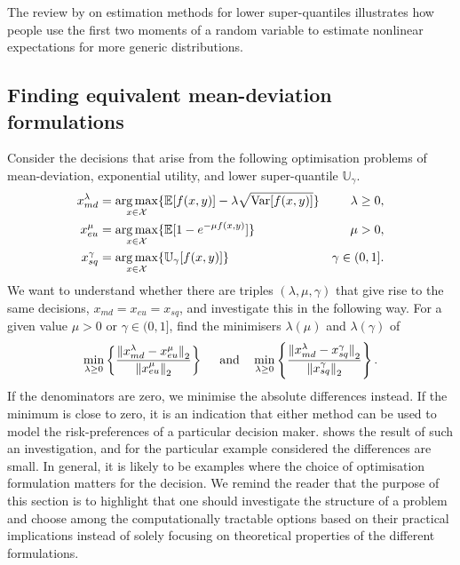 \documentclass[main.tex]{subfiles}
\begin{document}
The review by \citet{nadarajah2014estimation} on estimation methods for
lower super-quantiles illustrates how people use
the first two moments of a random variable to estimate nonlinear
expectations for more generic distributions.


\subsection{Finding equivalent mean-deviation formulations}
Consider the decisions that arise from the following
optimisation problems of mean-deviation, exponential utility, and
lower super-quantile $\mathbb{U}_\gamma$.
\begin{align}\label{eq:optim_formulations_md}
  x_{md}^\lambda
  &=\operatorname*{arg\,max}_{x\in\mathcal{X}}\{\mathbb{E}[f(x,y)]-\lambda\sqrt{\mbox{Var}[f(x,y)]}\}
  &\lambda\geq 0,\\\label{eq:optim_formulations_eu}
  x_{eu}^\mu
  &=\operatorname*{arg\,max}_{x\in\mathcal{X}}\{
    \mathbb{E}[1-e^{-\mu f(x,y)}]\}
  &\mu>0,\\\label{eq:optim_formulations_sq}
  x_{sq}^\gamma
  &=\operatorname*{arg\,max}_{x\in\mathcal{X}}
    \{\mathbb{U}_\gamma[f(x,y)]\}
  &\gamma\in(0,1].
\end{align}
We want to understand whether there are triples $(\lambda,\mu,\gamma)$ that give rise
to the same decisions, $x_{md}=x_{eu}=x_{sq}$, and investigate this in
the following way.
For a given value $\mu>0$ or $\gamma\in(0,1]$, find the minimisers
$\lambda(\mu)$ and $\lambda(\gamma)$ of
\begin{equation}\label{eq:min_xmd_xeu_xsq}
  \min_{\lambda\geq 0}\left\{\frac{{\|x_{md}^\lambda-x_{eu}^\mu\|}_2}{{{\|x_{eu}^\mu}\|}_2}\right\}\quad
  \textnormal{ and}\quad
  \min_{\lambda\geq 0}\left\{\frac{{\|x_{md}^\lambda-x_{sq}^\gamma\|}_2}{{{\|x_{sq}^\gamma}\|}_2}\right\}.
\end{equation}
If the denominators are zero, we minimise the absolute differences instead.
If the minimum is close to zero, it is an indication that either method
can be used to model the risk-preferences of a particular decision maker.
 shows the result of such an investigation,
and for the particular example considered the differences are small.
In general, it is likely to be examples where the choice of
optimisation formulation matters for the decision. We remind the
reader that the purpose of this
section is to highlight that one should investigate the structure of
a problem and choose among the computationally tractable options based
on their practical implications instead of solely focusing on
theoretical properties of the different formulations.
\end{document}
